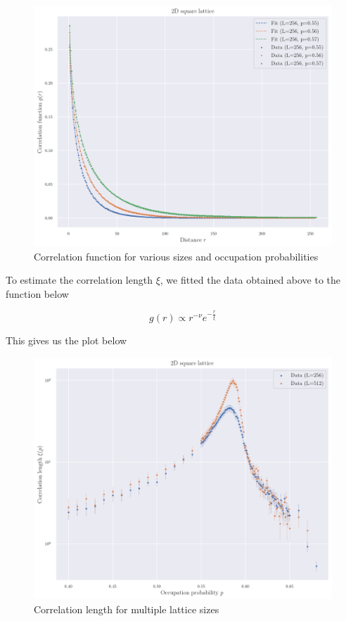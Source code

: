 \begin{figure}[H]
  \includegraphics[width=\linewidth]{Images/sim_corr_func_1.png}
  \caption{Correlation function for various sizes and occupation probabilities}
  \label{fig:sim_corr_func_1}
\end{figure}


To estimate the correlation length $\xi$, we fitted the data obtained above to the function below

$$ 
 g(r) \propto r^{-\nu} e^{-\frac{r}{\xi}}
$$ 

This gives us the plot below

\begin{figure}[H]
  \includegraphics[width=\linewidth]{Images/sim_corr_length_1.png}
  \caption{Correlation length for multiple lattice sizes}
  \label{fig:sim_corr_length_1}
\end{figure}






\clearpage
